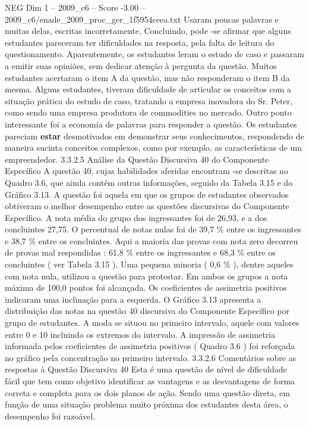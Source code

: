\begin{textsample}{NEG Dim 1 – 2009\_c6 – Score -3.00 – 2009\_c6/enade\_2009\_proc\_ger\_1f5954ceea.txt}
Usaram poucas palavras e muitas delas, escritas incorretamente.
Concluindo, pode -se afirmar que alguns estudantes pareceram ter dificuldades na resposta, pela falta de leitura do questionamento.
Aparentemente, os estudantes leram o estudo de caso e passaram a emitir suas opiniões, sem dedicar atenção à pergunta da questão.
Muitos estudantes acertaram o item A da questão, mas não responderam o item B da mesma.
Alguns estudantes, tiveram dificuldade de articular os conceitos com a situação prática do estudo de caso, tratando a empresa inovadora do Sr.
Peter, como sendo uma empresa produtora de commodities no mercado.
Outro ponto interessante foi a economia de palavras para responder a questão.
Os estudantes pareciam \textbf{estar} desmotivados em demonstrar seus conhecimentos, respondendo de maneira sucinta conceitos complexos, como por exemplo, as características de um empreendedor. 3.3.2.5 Análise da Questão Discursiva 40 do Componente Específico A questão 40, cujas habilidades aferidas encontram -se descritas no Quadro 3.6, que ainda contém outras informações, seguido da Tabela 3.15 e do Gráfico 3.13.
A questão foi aquela em que os grupos de estudantes observados obtiveram o melhor desempenho entre as questões discursivas do Componente Específico.
A nota média do grupo dos ingressantes foi de 26,93, e a dos concluintes 27,75.
O percentual de notas nulas foi de 39,7 \% entre os ingressantes e 38,7 \% entre os concluintes.
Aqui a maioria das provas com nota zero decorreu de provas mal respondidas : 61,8 \% entre os ingressantes e 68,3 \% entre os concluintes ( ver Tabela 3.15 ).
Uma pequena minoria ( 0,6 \% ), dentre aqueles com nota nula, utilizou a questão para protestar.
Em ambos os grupos a nota máxima de 100,0 pontos foi alcançada.
Os coeficientes de assimetria positivos indicaram uma inclinação para a esquerda.
O Gráfico 3.13 apresenta a distribuição das notas na questão 40 discursiva do Componente Específico por grupo de estudantes.
A moda se situou no primeiro intervalo, aquele com valores entre 0 e 10 incluindo os extremos do intervalo.
A impressão de assimetria informada pelos coeficientes de assimetria positivos ( Quadro 3.6 ) foi reforçada no gráfico pela concentração no primeiro intervalo. 3.3.2.6 Comentários sobre as respostas à Questão Discursiva 40 Esta é uma questão de nível de dificuldade fácil que tem como objetivo identificar as vantagens e as desvantagens de forma correta e completa para os dois planos de ação.
Sendo uma questão direta, em função de uma situação problema muito próxima dos estudantes desta área, o desempenho foi razoável.

\end{textsample}
